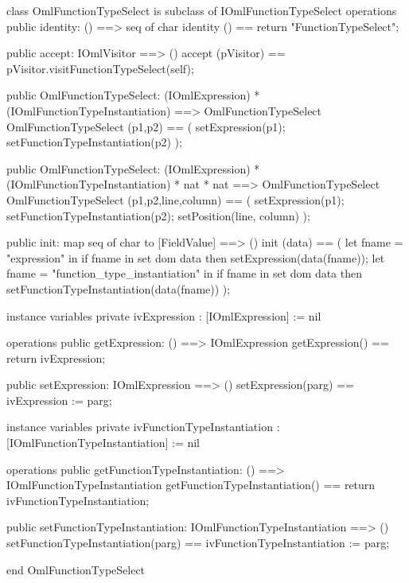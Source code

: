 \begin{vdm_al}
class OmlFunctionTypeSelect is subclass of IOmlFunctionTypeSelect
operations
  public identity: () ==> seq of char
  identity () == return "FunctionTypeSelect";

  public accept: IOmlVisitor ==> ()
  accept (pVisitor) == pVisitor.visitFunctionTypeSelect(self);

  public OmlFunctionTypeSelect:
    (IOmlExpression) *
    (IOmlFunctionTypeInstantiation) ==> OmlFunctionTypeSelect
  OmlFunctionTypeSelect (p1,p2) == 
    ( setExpression(p1);
      setFunctionTypeInstantiation(p2) );

  public OmlFunctionTypeSelect:
    (IOmlExpression) *
    (IOmlFunctionTypeInstantiation) *
    nat *
    nat ==> OmlFunctionTypeSelect
  OmlFunctionTypeSelect (p1,p2,line,column) == 
    ( setExpression(p1);
      setFunctionTypeInstantiation(p2);
      setPosition(line, column) );

  public init: map seq of char to [FieldValue] ==> ()
  init (data) ==
    ( let fname = "expression" in
        if fname in set dom data
        then setExpression(data(fname));
      let fname = "function_type_instantiation" in
        if fname in set dom data
        then setFunctionTypeInstantiation(data(fname)) );

instance variables
  private ivExpression : [IOmlExpression] := nil

operations
  public getExpression: () ==> IOmlExpression
  getExpression() == return ivExpression;

  public setExpression: IOmlExpression ==> ()
  setExpression(parg) == ivExpression := parg;

instance variables
  private ivFunctionTypeInstantiation : [IOmlFunctionTypeInstantiation] := nil

operations
  public getFunctionTypeInstantiation: () ==> IOmlFunctionTypeInstantiation
  getFunctionTypeInstantiation() == return ivFunctionTypeInstantiation;

  public setFunctionTypeInstantiation: IOmlFunctionTypeInstantiation ==> ()
  setFunctionTypeInstantiation(parg) == ivFunctionTypeInstantiation := parg;

end OmlFunctionTypeSelect
\end{vdm_al}

